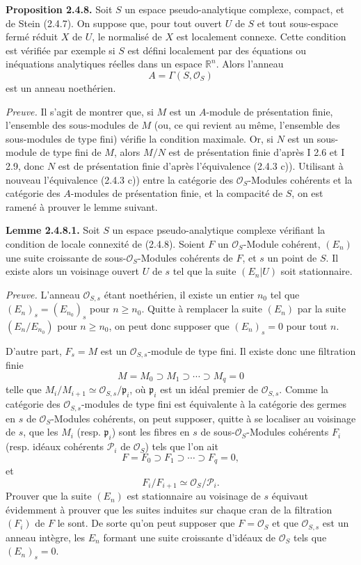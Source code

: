 \documentclass[11pt]{article}
\begin{document}
\textbf{Proposition 2.4.8.} Soit $S$ un espace pseudo-analytique complexe, compact, et de Stein (2.4.7). On suppose que, pour tout ouvert $U$ de $S$ et tout sous-espace fermé réduit $X$ de $U$, le normalisé de $X$ est localement connexe. Cette condition est vérifiée par exemple si $S$ est défini localement par des équations ou inéquations analytiques réelles dans un espace $\mathbb R^n$. Alors l'anneau
\[
A=\Gamma(S,\mathcal O_S)
\]
est un anneau noethérien.

\emph{Preuve.} Il s'agit de montrer que, si $M$ est un $A$-module de présentation finie, l'ensemble des sous-modules de $M$ (ou, ce qui revient au même, l'ensemble des sous-modules de type fini) vérifie la condition maximale. Or, si $N$ est un sous-module de type fini de $M$, alors $M/N$ est de présentation finie d'après I 2.6 et I 2.9, donc $N$ est de présentation finie d'après l'équivalence (2.4.3 c)). Utilisant à nouveau l'équivalence (2.4.3 c)) entre la catégorie des $\mathcal O_S$-Modules cohérents et la catégorie des $A$-modules de présentation finie, et la compacité de $S$, on est ramené à prouver le lemme suivant.

\textbf{Lemme 2.4.8.1.} Soit $S$ un espace pseudo-analytique complexe vérifiant la condition de locale connexité de (2.4.8). Soient $F$ un $\mathcal O_S$-Module cohérent, $(E_n)$ une suite croissante de sous-$\mathcal O_S$-Modules cohérents de $F$, et $s$ un point de $S$. Il existe alors un voisinage ouvert $U$ de $s$ tel que la suite $(E_n|U)$ soit stationnaire.

\emph{Preuve.} L'anneau $\mathcal O_{S,s}$ étant noethérien, il existe un entier $n_0$ tel que $(E_n)_s=(E_{n_0})_s$ pour $n\geq n_0$. Quitte à remplacer la suite $(E_n)$ par la suite $(E_n/E_{n_0})$ pour $n\geq n_0$, on peut donc supposer que $(E_n)_s=0$ pour tout $n$.

D'autre part, $F_s=M$ est un $\mathcal O_{S,s}$-module de type fini. Il existe donc une filtration finie
\[
M=M_0\supset M_1\supset\cdots\supset M_q=0
\]
telle que $M_i/M_{i+1}\simeq \mathcal O_{S,s}/\mathfrak p_i$, où $\mathfrak p_i$ est un idéal premier de $\mathcal O_{S,s}$. Comme la catégorie des $\mathcal O_{S,s}$-modules de type fini est équivalente à la catégorie des germes en $s$ de $\mathcal O_S$-Modules cohérents, on peut supposer, quitte à se localiser au voisinage de $s$, que les $M_i$ (resp. $\mathfrak p_i$) sont les fibres en $s$ de sous-$\mathcal O_S$-Modules cohérents $F_i$ (resp. idéaux cohérents $\mathcal P_i$ de $\mathcal O_S$) tels que l'on ait
\[
F=F_0\supset F_1\supset\cdots\supset F_q=0,
\]
et
\[
F_i/F_{i+1}\simeq \mathcal O_S/\mathcal P_i.
\]
Prouver que la suite $(E_n)$ est stationnaire au voisinage de $s$ équivaut évidemment à prouver que les suites induites sur chaque cran de la filtration $(F_i)$ de $F$ le sont. De sorte qu'on peut supposer que $F=\mathcal O_S$ et que $\mathcal O_{S,s}$ est un anneau intègre, les $E_n$ formant une suite croissante d'idéaux de $\mathcal O_S$ tels que $(E_n)_s=0$.
\end{document}
